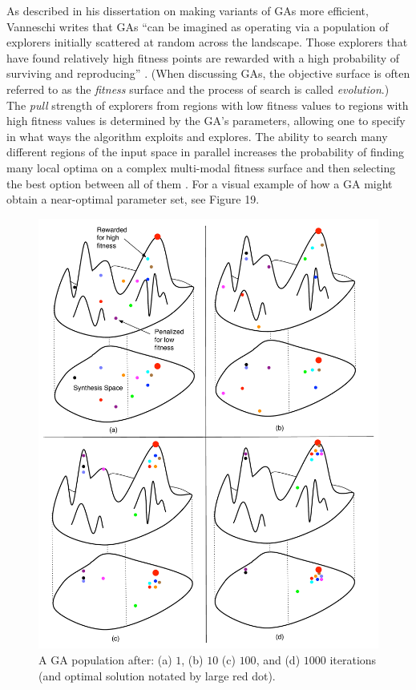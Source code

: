 \documentclass[12pt]{report} 	%
\numberwithin{figure}{chapter}
\numberwithin{table}{chapter}
\numberwithin{equation}{chapter}
\begin{document}
\begin{flushleft}
As described in his dissertation on making variants of GAs more efficient, Vanneschi writes that GAs ``can be imagined as operating via a population of explorers initially scattered at random across the landscape. Those explorers that have found relatively high fitness points are rewarded with a high probability of surviving and reproducing'' \cite[p. 70]{Vanneschi:2004le}. (When discussing GAs, the objective surface is often referred to as the \textit{fitness} surface and the process of search is called \textit{evolution}.) The \textit{pull} strength of explorers from regions with low fitness values to regions with high fitness values is determined by the GA's parameters, allowing one to specify in what ways the algorithm exploits and explores. The ability to search many different regions of the input space in parallel increases the probability of finding many local optima on a complex multi-modal fitness surface and then selecting the best option between all of them \cite[p. 37]{Garcia:2001jw}. For a visual example of how a GA might obtain a near-optimal parameter set, see Figure 19.
\begin{figure}[h!]
\begin{center}
\includegraphics[scale=0.50]{GASearch}
\caption[GA example]{A GA population after: (a) $1$, (b) $10$ (c) $100$, and (d) $1000$ iterations (and optimal solution notated by large red dot).}
\end{center}
\end{figure}


\end{flushleft}
\end{document}
